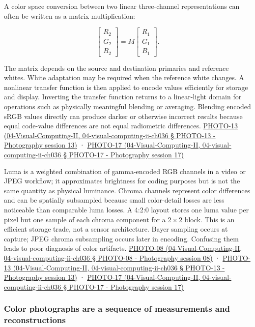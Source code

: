 A color space conversion between two linear three-channel representations can often be written as a matrix multiplication:

\[
\begin{bmatrix}R_2\\G_2\\B_2\end{bmatrix}
=M\begin{bmatrix}R_1\\G_1\\B_1\end{bmatrix}.
\]

The matrix depends on the source and destination primaries and reference whites. White adaptation may be required when the reference white changes. A nonlinear transfer function is then applied to encode values efficiently for storage and display. Inverting the transfer function returns to a linear-light domain for operations such as physically meaningful blending or averaging. Blending encoded sRGB values directly can produce darker or otherwise incorrect results because equal code-value differences are not equal radiometric differences. \href{}{PHOTO-13 (04-Visual-Computing-II, 04-visual-computing-ii-ch036 § PHOTO-13 - Photography session 13)} · \href{}{PHOTO-17 (04-Visual-Computing-II, 04-visual-computing-ii-ch036 § PHOTO-17 - Photography session 17)}

Luma is a weighted combination of gamma-encoded RGB channels in a video or JPEG workflow; it approximates brightness for coding purposes but is not the same quantity as physical luminance. Chroma channels represent color differences and can be spatially subsampled because small color-detail losses are less noticeable than comparable luma losses. A 4:2:0 layout stores one luma value per pixel but one sample of each chroma component for a \(2\times2\) block. This is an efficient storage trade, not a sensor architecture. Bayer sampling occurs at capture; JPEG chroma subsampling occurs later in encoding. Confusing them leads to poor diagnosis of color artifacts. \href{}{PHOTO-08 (04-Visual-Computing-II, 04-visual-computing-ii-ch036 § PHOTO-08 - Photography session 08)} · \href{}{PHOTO-13 (04-Visual-Computing-II, 04-visual-computing-ii-ch036 § PHOTO-13 - Photography session 13)} · \href{}{PHOTO-17 (04-Visual-Computing-II, 04-visual-computing-ii-ch036 § PHOTO-17 - Photography session 17)}

\subsubsection{Color photographs are a sequence of measurements and reconstructions}\label{color-photographs-are-a-sequence-of-measurements-and-reconstructions}

